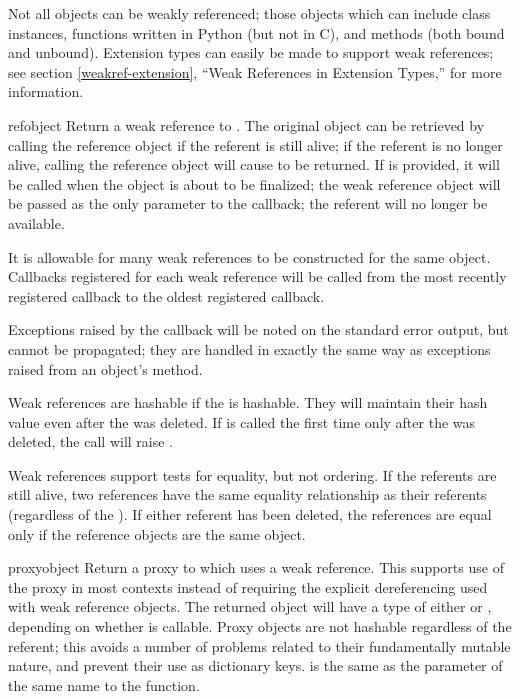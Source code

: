 Not all objects can be weakly referenced; those objects which can
include class instances, functions written in Python (but not in C),
and methods (both bound and unbound).  Extension types can easily
be made to support weak references; see section \ref{weakref-extension},
``Weak References in Extension Types,'' for more information.


\begin{funcdesc}{ref}{object}
  Return a weak reference to .  The original object can be
  retrieved by calling the reference object if the referent is still
  alive; if the referent is no longer alive, calling the reference
  object will cause  to be returned.  If  is
  provided, it will be called when the object is about to be
  finalized; the weak reference object will be passed as the only
  parameter to the callback; the referent will no longer be available.

  It is allowable for many weak references to be constructed for the
  same object.  Callbacks registered for each weak reference will be
  called from the most recently registered callback to the oldest
  registered callback.

  Exceptions raised by the callback will be noted on the standard
  error output, but cannot be propagated; they are handled in exactly
  the same way as exceptions raised from an object's
   method.

  Weak references are hashable if the  is hashable.  They
  will maintain their hash value even after the  was
  deleted.  If  is called the first time only after
  the  was deleted, the call will raise
  .

  Weak references support tests for equality, but not ordering.  If
  the referents are still alive, two references have the same
  equality relationship as their referents (regardless of the
  ).  If either referent has been deleted, the
  references are equal only if the reference objects are the same
  object.
\end{funcdesc}

\begin{funcdesc}{proxy}{object}
  Return a proxy to  which uses a weak reference.  This
  supports use of the proxy in most contexts instead of requiring the
  explicit dereferencing used with weak reference objects.  The
  returned object will have a type of either  or
  , depending on whether  is
  callable.  Proxy objects are not hashable regardless of the
  referent; this avoids a number of problems related to their
  fundamentally mutable nature, and prevent their use as dictionary
  keys.   is the same as the parameter of the same name
  to the  function.
\end{funcdesc}

